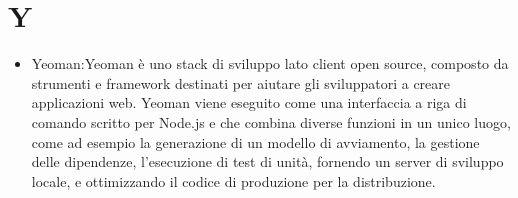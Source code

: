 \section{Y}
	\begin{itemize}
		\item{Yeoman}:Yeoman è uno stack di sviluppo lato client open source, composto da strumenti e framework destinati per aiutare gli sviluppatori a creare applicazioni web. Yeoman viene eseguito come una interfaccia a riga di comando scritto per Node.js e che combina diverse funzioni in un unico luogo, come ad esempio la generazione di un modello di avviamento, la gestione delle dipendenze, l'esecuzione di test di unità, fornendo un server di sviluppo locale, e ottimizzando il codice di produzione per la distribuzione.
	\end{itemize}